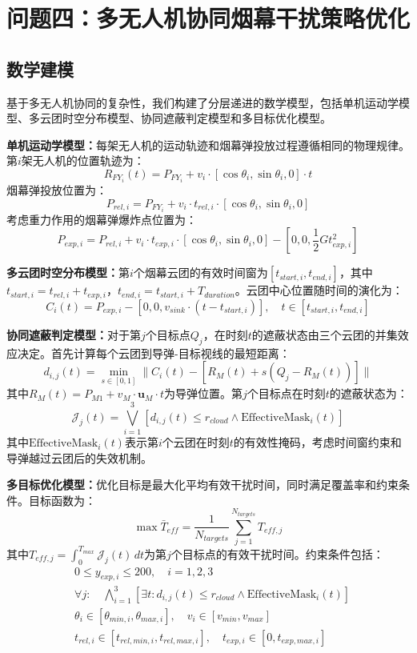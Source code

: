 \section{问题四：多无人机协同烟幕干扰策略优化}

\subsection{数学建模}

基于多无人机协同的复杂性，我们构建了分层递进的数学模型，包括单机运动学模型、多云团时空分布模型、协同遮蔽判定模型和多目标优化模型。

\textbf{单机运动学模型：}每架无人机的运动轨迹和烟幕弹投放过程遵循相同的物理规律。第$i$架无人机的位置轨迹为：
\[
R_{FY_i}(t) = P_{FY_i} + v_i \cdot [\cos\theta_i, \sin\theta_i, 0] \cdot t
\]
烟幕弹投放位置为：
\[
P_{rel,i} = P_{FY_i} + v_i \cdot t_{rel,i} \cdot [\cos\theta_i, \sin\theta_i, 0]
\]
考虑重力作用的烟幕弹爆炸点位置为：
\[
P_{exp,i} = P_{rel,i} + v_i \cdot t_{exp,i} \cdot [\cos\theta_i, \sin\theta_i, 0] - [0, 0, \frac{1}{2}G t_{exp,i}^2]
\]

\textbf{多云团时空分布模型：}第$i$个烟幕云团的有效时间窗为$[t_{start,i}, t_{end,i}]$，其中$t_{start,i} = t_{rel,i} + t_{exp,i}$，$t_{end,i} = t_{start,i} + T_{duration}$。云团中心位置随时间的演化为：
\[
C_i(t) = P_{exp,i} - [0, 0, v_{sink} \cdot (t - t_{start,i})], \quad t \in [t_{start,i}, t_{end,i}]
\]

\textbf{协同遮蔽判定模型：}对于第$j$个目标点$Q_j$，在时刻$t$的遮蔽状态由三个云团的并集效应决定。首先计算每个云团到导弹-目标视线的最短距离：
\[
d_{i,j}(t) = \min_{s \in [0,1]} \|C_i(t) - [R_M(t) + s(Q_j - R_M(t))]\|
\]
其中$R_M(t) = P_{M1} + v_M \cdot \mathbf{u}_M \cdot t$为导弹位置。第$j$个目标点在时刻$t$的遮蔽状态为：
\[
\mathcal{J}_j(t) = \bigvee_{i=1}^{3} \left[ d_{i,j}(t) \leq r_{cloud} \land \text{EffectiveMask}_i(t) \right]
\]
其中$\text{EffectiveMask}_i(t)$表示第$i$个云团在时刻$t$的有效性掩码，考虑时间窗约束和导弹越过云团后的失效机制。

\textbf{多目标优化模型：}优化目标是最大化平均有效干扰时间，同时满足覆盖率和约束条件。目标函数为：
\[
\max \bar{T}_{eff} = \frac{1}{N_{targets}} \sum_{j=1}^{N_{targets}} T_{eff,j}
\]
其中$T_{eff,j} = \int_{0}^{T_{max}} \mathcal{J}_j(t) \, dt$为第$j$个目标点的有效干扰时间。约束条件包括：
\begin{align}
&0 \leq y_{exp,i} \leq 200, \quad i = 1,2,3 \\
&\forall j: \quad \bigwedge_{i=1}^{3} \left[ \exists t: d_{i,j}(t) \leq r_{cloud} \land \text{EffectiveMask}_i(t) \right] \\
&\theta_i \in [\theta_{min,i}, \theta_{max,i}], \quad v_i \in [v_{min}, v_{max}] \\
&t_{rel,i} \in [t_{rel,min,i}, t_{rel,max,i}], \quad t_{exp,i} \in [0, t_{exp,max,i}]
\end{align}

